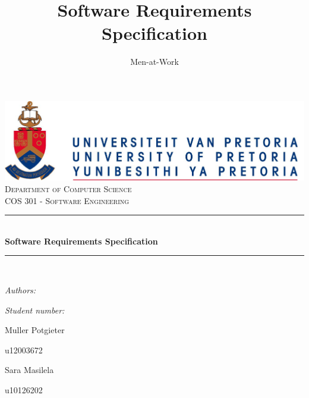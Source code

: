 \documentclass[hidelinks,a4paper,12pt]{article}
\author{Men-at-Work}
\title{ Software Requirements Specification}
\newcommand{\HRule}{\rule{\linewidth}{0.5mm}}
\begin{document}
	\setlength{\parskip}{6pt}
	
	\begin{titlepage}
		
		\begin{center}
			\includegraphics[width=1\textwidth]{./Graphs/UPLogo2012.jpg}\\[0.4cm]    
			\textsc{\LARGE Department of Computer Science}\\[1.5cm]
			\textsc{\Large COS 301 - Software Engineering}\\[0.5cm]
			\HRule \\[0.4cm]
			{ \huge \bfseries Software Requirements Specification}\\[0.4cm]
			\HRule \\[0.4cm]
			\begin{minipage}{0.4\textwidth}
				\begin{flushleft} \large
					\emph{Authors:}
				\end{flushleft}
			\end{minipage}
			\begin{minipage}{0.4\textwidth}
				\begin{flushright} \large
					\emph{Student number:}
				\end{flushright}
			\end{minipage}
			
			\begin{minipage}{0.4\textwidth}
				\begin{flushleft} \large
					Muller {Potgieter}
				\end{flushleft}
			\end{minipage}
			\begin{minipage}{0.4\textwidth}
				\begin{flushright} \large
					\emph{}
					u12003672
				\end{flushright}
			\end{minipage}
			
			\begin{minipage}{0.4\textwidth}
				\begin{flushleft} \large
					Sara {Masilela}
				\end{flushleft}
			\end{minipage}
			\begin{minipage}{0.4\textwidth}
				\begin{flushright} \large
					\emph{}
					u10126202
				\end{flushright}
			\end{minipage}
			

\end{center}
\end{titlepage}
\end{document}
